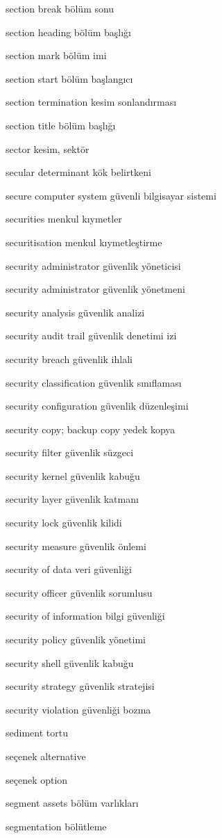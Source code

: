 \documentclass[12pt,fleqn]{article}\usepackage{../../common}
\begin{document}
section break bölüm sonu

section heading bölüm başlığı

section mark bölüm imi

section start bölüm başlangıcı

section termination kesim sonlandırması

section title bölüm başlığı

sector kesim, sektör

secular determinant kök belirtkeni

secure computer system güvenli bilgisayar sistemi

securities menkul kıymetler

securitisation menkul kıymetleştirme

security administrator güvenlik yöneticisi

security administrator güvenlik yönetmeni

security analysis güvenlik analizi

security audit trail güvenlik denetimi izi

security breach güvenlik ihlali

security classification güvenlik sınıflaması

security configuration güvenlik düzenleşimi

security copy; backup copy yedek kopya

security filter güvenlik süzgeci

security kernel güvenlik kabuğu

security layer güvenlik katmanı

security lock güvenlik kilidi

security measure güvenlik önlemi

security of data veri güvenliği

security officer güvenlik sorumlusu

security of information bilgi güvenliği

security policy güvenlik yönetimi

security shell güvenlik kabuğu

security strategy güvenlik stratejisi

security violation güvenliği bozma

sediment tortu

seçenek alternative

seçenek option

segment assets bölüm varlıkları

segmentation bölütleme
\end{document}
